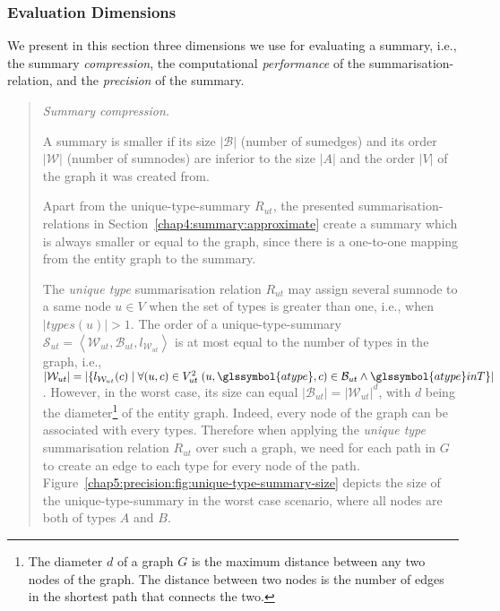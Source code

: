 \subsubsection{Evaluation Dimensions}

We present in this section three dimensions we use for evaluating a summary, i.e., the summary \emph{compression}, the computational \emph{performance} of the \gls{summarisation-relation}, and the \emph{precision} of the summary.

\begin{quotation}
	\item[\emph{Summary compression.}]

	A summary is smaller if its size $\vert \mathcal{B} \vert$ (number of sumedges) and its order $\vert \mathcal{W} \vert$ (number of sumnodes) are inferior to the size $\vert A \vert$ and the order $\vert V \vert$ of the graph it was created from.

	Apart from the \gls{unique-type-summary} $R_{ut}$, the presented \glspl{summarisation-relation} in Section~\ref{chap4:summary:approximate} create a summary which is always smaller or equal to the graph, since there is a one-to-one mapping from the entity graph to the summary.

	The \emph{unique type} summarisation relation $R_{ut}$ may assign several sumnode to a same node $u \in V$ when the set of \gls{types} is greater than one, i.e., when $\vert types(u) \vert > 1$. The order of a \gls{unique-type-summary} $\mathcal{S}_{ut} = \left\langle \mathcal{W}_{ut}, \mathcal{B}_{ut}, l_{\mathcal{W}_{ut}} \right\rangle$ is at most equal to the number of types in the graph, i.e., $\vert \mathcal{W}_{ut} \vert = \vert \{ l_{\mathcal{W}_{ut}}(c) \mid \forall (u, c) \in V^2_{ut}\; (u, \glssymbol{atype}, c) \in \mathcal{B}_{ut} \wedge \glssymbol{atype} in T \} \vert$. However, in the worst case, its size can equal $\vert \mathcal{B}_{ut} \vert = \vert \mathcal{W}_{ut} \vert ^d$, with $d$ being the diameter\footnote{The diameter $d$ of a graph $G$ is the maximum distance between any two nodes of the graph. The distance between two nodes is the number of edges in the shortest path that connects the two.} of the entity graph. Indeed, every node of the graph can be associated with every types. Therefore when applying the \emph{unique type} summarisation relation $R_{ut}$ over such a graph, we need for each path in $G$ to create an edge to each type for every node of the path. Figure~\ref{chap5:precision:fig:unique-type-summary-size} depicts the size of the \gls{unique-type-summary} in the worst case scenario, where all nodes are both of types $A$ and $B$.


\end{quotation}

